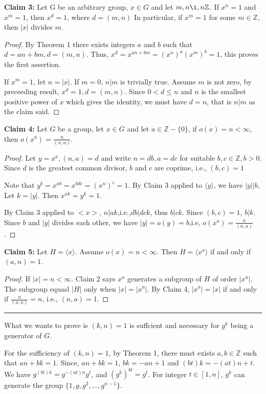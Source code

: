 \documentclass[12pt]{article}
\begin{document}
\noindent \textbf{Claim 3: } Let G be an arbitrary group, $x\in G$ and let $m,n\i,n\mathbb{Z}$. If $x^n = 1$ and $x^m = 1$, then $x^d = 1$, where $d=(m,n)$ In particular, if $x^m = 1$ for some $m\in\mathbb{Z}$, then $|x|$ divides $m$.
\begin{proof}
By Theorem 1 there exists integers $a$ and $b$ such that $d=an+bm,d=(m,n)$. Thus, $x^d=x^{an+bm}=(x^n)^a(x^m)^b=1$, this proves the first assertion.

If $x^m=1$, let $n=|x|$. If $m=0$, $n|m$ is trivially true. Assume $m$ is not zero, by preceeding result, $x^d=1,d=(m,n)$. Since $0< d\le n$ and $n$ is the smallest positive power of $x$ which gives the identity, we must have $d=n$, that is $n|m$ as the claim said.
\end{proof}
\noindent \textbf{Claim 4:} Let $G$ be a group, let $x\in G$ and let $a\in\mathbb{Z}-\{0\}$, if $o(x)=n<\infty$, then $o(x^a)=\frac{n}{(n,a)}$. 
\begin{proof}
Let $y=x^a,(n,a)=d$ and write $n=db,a=dc$ for suitable $b,c\in\mathbb{Z},b>0$. Since $d$ is the greatest common divisor, $b$ and $c$ are coprime, i.e., $(b,c)=1$

Note that $y^b=x^{ab}=x^{bdc}=(x^n)^c=1$. By Claim 3 applied to $\langle y\rangle$, we have $|y||b$, Let $k=|y|$. Then $x^{ak}=y^k=1$. 

By Claim 3 applied to $<x>$, $n|ak$,i.e.,$db|dck$, thus $b|ck$. Since $(b,c)=1$, $b|k$. Since $b$ and $|y|$ divides each other, we have $|y|=o(y)=b$,i.e, $o(x^a)=\frac{n}{(n,a)}$.
\end{proof}
\noindent \textbf{Claim 5:} Let $H=\langle x\rangle$. Assume $o(x)=n<\infty$. Then $H=\langle x^a\rangle$ if and only if $(a,n)=1$.
\begin{proof}
If $|x|=n<\infty$. Claim 2 says $x^a$ generates a subgroup of $H$ of order $|x^a|$. The subgroup equasl $|H|$ only when $|x|=|x^a|$. By Claim 4, $|x^a|=|x|$ if and only if $\frac{n}{(a,n)}=n$, i.e., $(n,a)=1$.
\end{proof}
\noindent\rule{\textwidth}{1pt}

What we wants to prove is $(k,n)=1$ is suffcient and necessary for $g^k$ being a generator of $G$.

For the sufficiency of $(k,n)=1$, by Theorem 1, there must exists $a,b\in\mathbb{Z}$ such that $an+bk=1$. Since, $an+bk=1$, $bk=-an+1$ and $(bt)k=-(at)n+t$. We have $g^{(bt)k}=g^{-(at)n}g^t$, and $(g^k)^{bt}=g^t$. For integer $t\in[1,n]$, $g^k$ can generate the group $\{1,g,g^2,\dots,g^{n-1}\}$.
\end{document}
